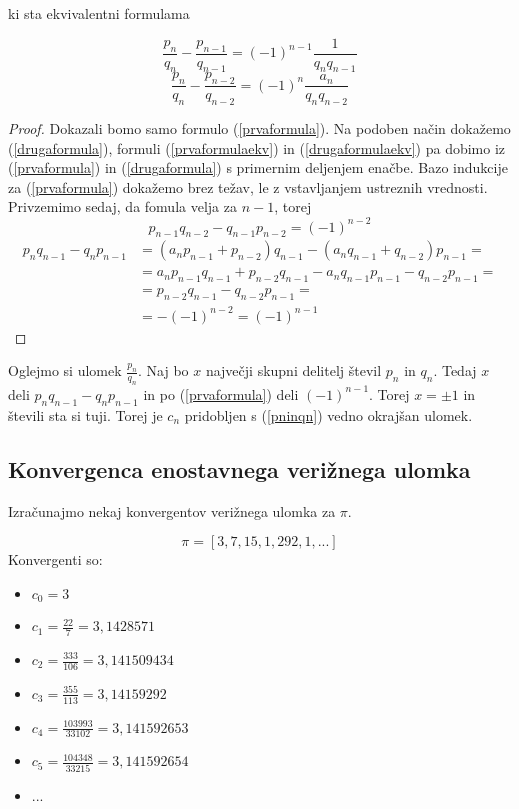 \documentclass[a4paper,12pt]{article}
\theoremstyle{definition}
\theoremstyle{proposition}
\theoremstyle{theorem}
\theoremstyle{lemma}
\begin{document}
ki sta ekvivalentni formulama

\begin{equation}
\label{prvaformulaekv}
\frac{p_n}{q_n} - \frac{p_{n-1}}{q_{n-1}} = (-1)^{n-1}\frac{1}{q_n q_{n-1}}
\end{equation}
\begin{equation}
\label{drugaformulaekv}
\frac{p_n}{q_n} - \frac{p_{n-2}}{q_{n-2}} = (-1)^{n}\frac{a_n}{q_n q_{n-2}}
\end{equation}

\begin{proof}
Dokazali bomo samo formulo (\ref{prvaformula}). Na podoben način dokažemo (\ref{drugaformula}), formuli (\ref{prvaformulaekv}) in (\ref{drugaformulaekv}) pa dobimo iz (\ref{prvaformula}) in (\ref{drugaformula}) s primernim deljenjem enačbe.
Bazo indukcije za (\ref{prvaformula}) dokažemo brez težav, le z vstavljanjem ustreznih vrednosti. Privzemimo sedaj, da fomula velja za $n-1$, torej 
\[ p_{n-1} q_{n-2} - q_{n-1} p_{n-2} = (-1)^{n-2} \]
\begin{equation*}
\begin{split}
p_n q_{n-1} - q_n p_{n-1} &= (a_{n}p_{n-1} + p_{n-2}) q_{n-1} - (a_{n}q_{n-1} + q_{n-2}) p_{n-1} = \\
&= a_{n}p_{n-1}q_{n-1} + p_{n-2} q_{n-1} - a_{n}q_{n-1}p_{n-1} - q_{n-2} p_{n-1} = \\
&= p_{n-2} q_{n-1} - q_{n-2} p_{n-1} = \\
&= -(-1)^{n-2} = (-1)^{n-1}
\end{split}
\end{equation*}
\end{proof}

Oglejmo si ulomek $\frac{p_n}{q_n}$. Naj bo $x$ največji skupni delitelj števil $p_n$ in $q_n$. Tedaj $x$ deli $p_n q_{n-1} - q_n p_{n-1}$ in po (\ref{prvaformula}) deli $(-1)^{n-1}$. Torej $x= \pm 1$ in števili sta si tuji. Torej je $c_n$  pridobljen s (\ref{pninqn}) vedno okrajšan ulomek.\\

\subsection{Konvergenca enostavnega verižnega ulomka} \label{konvca}

Izračunajmo nekaj konvergentov verižnega ulomka za $\pi$.

\[ \pi = [3, 7, 15, 1, 292, 1, ...] \]
Konvergenti so:
	\begin{itemize}
	\item $c_0 = 3$
	\item $c_1 = \frac{22}{7} = 3,1428571$
	\item $c_2 = \frac{333}{106} = 3,141509434$
	\item $c_3 = \frac{355}{113} = 3,14159292$
	\item $c_4 = \frac{103993}{33102} = 3,141592653$
	\item $c_5 = \frac{104348}{33215} = 3,141592654$
	\item ...
	\end{itemize}
	
\end{document}
